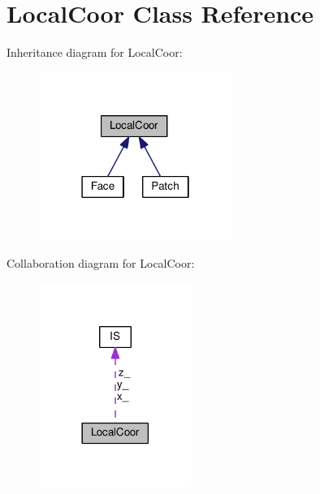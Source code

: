 \hypertarget{classLocalCoor}{\section{Local\+Coor Class Reference}
\label{classLocalCoor}
}


Inheritance diagram for Local\+Coor\+:\nopagebreak
\begin{figure}[H]
\begin{center}
\leavevmode
\includegraphics[width=178pt]{classLocalCoor__inherit__graph}
\end{center}
\end{figure}


Collaboration diagram for Local\+Coor\+:\nopagebreak
\begin{figure}[H]
\begin{center}
\leavevmode
\includegraphics[width=141pt]{classLocalCoor__coll__graph}
\end{center}
\end{figure}
